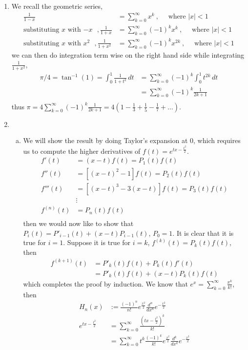 \documentclass[a4paper,12pt]{article}
\theoremstyle{definition}
\begin{document}
\begin{enumerate}
\item We recall the geometric series,
\begin{align*}
\frac{1}{1-x} &= \sum_{k=0}^{\infty}x^k~, \quad\text{ where $|x|<1$}\\
\text{substituting $x$ with $-x$ }, \frac{1}{1+x} &= \sum_{k=0}^{\infty}(-1)^kx^k~, \quad\text{ where $|x|<1$}\\
\text{substituting $x$ with $x^2$ }, \frac{1}{1+x^2} &= \sum_{k=0}^{\infty}(-1)^kx^{2k}~, \quad\text{ where $|x|<1$}
\end{align*}
we can then do integration term wise on the right hand side while integrating $\frac{1}{1+x^2}$,
\begin{align*}
\pi/4=\tan^{-1}(1) = \int_{0}^{1}\frac{1}{1+t^2}\,dt &= \sum_{k=0}^{\infty}(-1)^k\int_{0}^{1}t^{2k}\,dt\\
&= \sum_{k=0}^{\infty}(-1)^k\frac{1}{2k+1}\\
\end{align*}
thus $\pi = 4\sum_{k=0}^{\infty}(-1)^k\frac{1}{2k+1} = 4\left(1-\frac{1}{3}+\frac{1}{5}-\frac{1}{7}+\ldots\right)$.


\item
\begin{enumerate}[(a)]
\item We will show the result by doing Taylor's expansion at $0$, which requires us to compute the higher derivatives of $f(t) = e^{tx-\frac{t^2}{2}}$.
\begin{align*}
f'(t) &= (x-t) f(t) = P_1(t)f(t)\\
f''(t) &= \left[(x-t)^2-1\right] f(t) = P_2(t)f(t)\\
f'''(t) &= \left[(x-t)^3-3(x-t)\right] f(t)= P_3(t)f(t)\\
&\vdots\\
f^{(n)}(t) &= P_n(t)f(t)\\
\end{align*}
then we would now like to show that $P_i(t) = P'_{i-1}(t)+(x-t)P_{i-1}(t)$, $P_0 = 1$. It is clear that it is true for $i=1$. Suppose it is true for $i=k$, $f^{(k)}(t) = P_k(t)f(t)$, then
\begin{align*}
f^{(k+1)}(t) &= P'_k(t)f(t) + P_k(t)f'(t)\\
&=P'_k(t)f(t)+(x-t)P_k(t)f(t)
\end{align*}
which completes the proof by induction.
We know that $e^x = \sum_{k=0}^{\infty}\frac{x^k}{k!}$, then 
\begin{align*}
H_n(x) &:= \frac{(-1)^n}{n!}e^{\frac{x^2}{2}}\frac{d^n}{dx^n}e^{-\frac{x^2}{2}}\\
e^{tx-\frac{t^2}{2}} &= \sum_{k=0}^{\infty}\frac{(tx-\frac{t^2}{2})^k}{k!} \\
&=\sum_{k=0}^{\infty}t^k \frac{(-1)^k}{k!}e^{\frac{x^2}{2}}\frac{d^k}{dx^k}e^{-\frac{x^2}{2}}\\
\end{align*}


\end{enumerate}
\end{enumerate}
\end{document}
